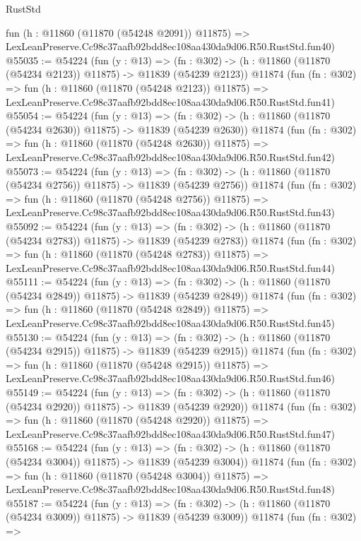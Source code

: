 \begin{lexlean}{RustStd}
\begin{coremodule}
    fun (h : @11860 (@11870 (@54248 @2091)) @11875) =>
    LexLeanPreserve.Cc98c37aafb92bdd8ec108aa430da9d06.R50.RustStd.fun40)
@55035 := @54224
    (fun (y : @13) =>
    (fn : @302) -> (h : @11860 (@11870 (@54234 @2123)) @11875) -> @11839 (@54239 @2123))
    @11874
    (fun (fn : @302) =>
    fun (h : @11860 (@11870 (@54248 @2123)) @11875) =>
    LexLeanPreserve.Cc98c37aafb92bdd8ec108aa430da9d06.R50.RustStd.fun41)
@55054 := @54224
    (fun (y : @13) =>
    (fn : @302) -> (h : @11860 (@11870 (@54234 @2630)) @11875) -> @11839 (@54239 @2630))
    @11874
    (fun (fn : @302) =>
    fun (h : @11860 (@11870 (@54248 @2630)) @11875) =>
    LexLeanPreserve.Cc98c37aafb92bdd8ec108aa430da9d06.R50.RustStd.fun42)
@55073 := @54224
    (fun (y : @13) =>
    (fn : @302) -> (h : @11860 (@11870 (@54234 @2756)) @11875) -> @11839 (@54239 @2756))
    @11874
    (fun (fn : @302) =>
    fun (h : @11860 (@11870 (@54248 @2756)) @11875) =>
    LexLeanPreserve.Cc98c37aafb92bdd8ec108aa430da9d06.R50.RustStd.fun43)
@55092 := @54224
    (fun (y : @13) =>
    (fn : @302) -> (h : @11860 (@11870 (@54234 @2783)) @11875) -> @11839 (@54239 @2783))
    @11874
    (fun (fn : @302) =>
    fun (h : @11860 (@11870 (@54248 @2783)) @11875) =>
    LexLeanPreserve.Cc98c37aafb92bdd8ec108aa430da9d06.R50.RustStd.fun44)
@55111 := @54224
    (fun (y : @13) =>
    (fn : @302) -> (h : @11860 (@11870 (@54234 @2849)) @11875) -> @11839 (@54239 @2849))
    @11874
    (fun (fn : @302) =>
    fun (h : @11860 (@11870 (@54248 @2849)) @11875) =>
    LexLeanPreserve.Cc98c37aafb92bdd8ec108aa430da9d06.R50.RustStd.fun45)
@55130 := @54224
    (fun (y : @13) =>
    (fn : @302) -> (h : @11860 (@11870 (@54234 @2915)) @11875) -> @11839 (@54239 @2915))
    @11874
    (fun (fn : @302) =>
    fun (h : @11860 (@11870 (@54248 @2915)) @11875) =>
    LexLeanPreserve.Cc98c37aafb92bdd8ec108aa430da9d06.R50.RustStd.fun46)
@55149 := @54224
    (fun (y : @13) =>
    (fn : @302) -> (h : @11860 (@11870 (@54234 @2920)) @11875) -> @11839 (@54239 @2920))
    @11874
    (fun (fn : @302) =>
    fun (h : @11860 (@11870 (@54248 @2920)) @11875) =>
    LexLeanPreserve.Cc98c37aafb92bdd8ec108aa430da9d06.R50.RustStd.fun47)
@55168 := @54224
    (fun (y : @13) =>
    (fn : @302) -> (h : @11860 (@11870 (@54234 @3004)) @11875) -> @11839 (@54239 @3004))
    @11874
    (fun (fn : @302) =>
    fun (h : @11860 (@11870 (@54248 @3004)) @11875) =>
    LexLeanPreserve.Cc98c37aafb92bdd8ec108aa430da9d06.R50.RustStd.fun48)
@55187 := @54224
    (fun (y : @13) =>
    (fn : @302) -> (h : @11860 (@11870 (@54234 @3009)) @11875) -> @11839 (@54239 @3009))
    @11874
    (fun (fn : @302) =>

\end{coremodule}
\end{lexlean}
